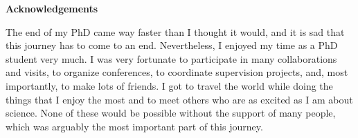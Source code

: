 \documentclass[letterpaper,12pt,titlepage,oneside,final]{book}
\let\origdoublepage\cleardoublepage
\newcommand{\clearemptydoublepage}{%
  \clearpage{\pagestyle{empty}\origdoublepage}}
\let\cleardoublepage\clearemptydoublepage
\begin{document}






\cleardoublepage
{}    %

\begin{center}\textbf{Acknowledgements}\end{center}


The end of my PhD came way faster than I thought it would, and it is sad that this journey has to come to an end. Nevertheless, I enjoyed my time as a PhD student very much. I was very fortunate to participate in many collaborations and visits, to organize conferences, to coordinate supervision projects, and, most importantly, to make lots of friends. I got to travel the world while doing the things that I enjoy the most and to meet others who are as excited as I am about science. None of these would be possible without the support of many people, which was arguably the most important part of this journey. 

\end{document}

